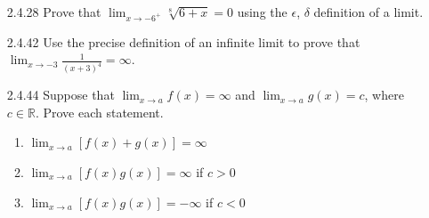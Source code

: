 \documentclass{article}
\begin{document}
\begin{enumerate}
    \item[2.4.28]
        Prove that $\displaystyle \lim_{x \to -6^{+}} \sqrt[8]{6+x} = 0$ \quad using the $\epsilon$, $\delta$ definition of a limit.

    \newpage

    \item[2.4.42]
        Use the precise definition of an infinite limit to
        prove that
        $\displaystyle \lim_{x \to -3} \frac{1}{(x+3)^4} = \infty$.

    \vspace{7cm}

    \item[2.4.44]
        Suppose that $\displaystyle \lim_{x \to a} f(x) = \infty$ and
        $\displaystyle \lim_{x \to a} g(x) = c$,
        where $c \in \mathbb{R}$.
        Prove each statement.
        \begin{enumerate}
            \item $\displaystyle \lim_{x \to a} \left[f(x) + g(x)\right]=\infty$
            \item $\displaystyle \lim_{x \to a} \left[f(x) g(x)\right]=\infty$ if $c > 0$
            \item $\displaystyle \lim_{x \to a} \left[f(x) g(x)\right]=-\infty$ if $c < 0$
        \end{enumerate}


\end{enumerate}
\end{document}
